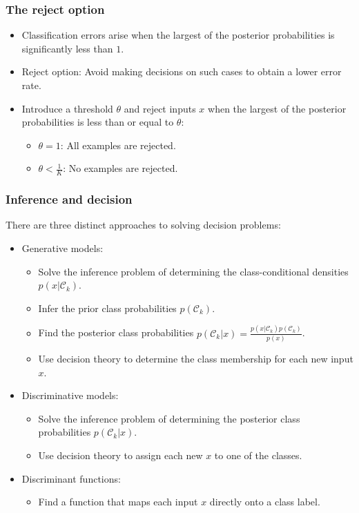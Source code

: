 \documentclass{beamer}
\begin{document}
\begin{frame}
    \frametitle{The reject option}
    \begin{itemize}
        \item Classification errors arise when the largest of the posterior probabilities is significantly less than $1$.
        \item Reject option: Avoid making decisions on such cases to obtain a lower error rate.
        \item Introduce a threshold $\theta$ and reject inputs $x$ when the largest of the posterior probabilities is less than or equal to $\theta$:
        \begin{itemize}
            \item $\theta=1$: All examples are rejected.
            \item $\theta<\frac{1}{K}$: No examples are rejected.
        \end{itemize}
    \end{itemize}
\end{frame}

\begin{frame}
    \frametitle{Inference and decision}
    There are three distinct approaches to solving decision problems:
    \begin{itemize}
        \item Generative models:
        \begin{itemize}
            \item Solve the inference problem of determining the class-conditional densities $p(x|\mathcal{C}_{k})$.
            \item Infer the prior class probabilities $p(\mathcal{C}_{k})$.
            \item Find the posterior class probabilities $p(\mathcal{C}_{k}|x)=\frac{p(x|\mathcal{C}_{k})p(\mathcal{C}_{k})}{p(x)}$.
            \item Use decision theory to determine the class membership for each new input $x$.
        \end{itemize}
        \item Discriminative models:
        \begin{itemize}
            \item Solve the inference problem of determining the posterior class probabilities $p(\mathcal{C}_{k}|x)$.
            \item Use decision theory to assign each new $x$ to one of the classes.
        \end{itemize}
        \item Discriminant functions:
        \begin{itemize}
            \item Find a function that maps each input $x$ directly onto a class label.
        \end{itemize}
    \end{itemize}
\end{frame}
\end{document}
